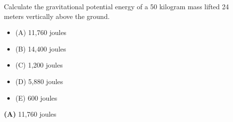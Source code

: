 

Calculate the gravitational potential energy of a 50 kilogram mass lifted 24 meters vertically above the ground.

\begin{itemize}
\item{(A)} 11,760 joules
\vskip 5pt 
\item{(B)} 14,400 joules
\vskip 5pt 
\item{(C)} 1,200 joules
\vskip 5pt 
\item{(D)} 5,880 joules
\vskip 5pt 
\item{(E)} 600 joules
\end{itemize}







{\bf (A)} 11,760 joules
 










